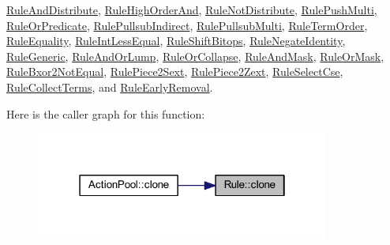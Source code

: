 \mbox{\hyperlink{class_rule_and_distribute_a7c22fc9d5e1f837afb8b13a9cc83ddff}{Rule\+And\+Distribute}}, \mbox{\hyperlink{class_rule_high_order_and_a467fae8c3fcb0944360aa286fa7a44e9}{Rule\+High\+Order\+And}}, \mbox{\hyperlink{class_rule_not_distribute_a15ef3668c177ca8008f4ca27b627c9c3}{Rule\+Not\+Distribute}}, \mbox{\hyperlink{class_rule_push_multi_ae44a8242704738c9f0d415c3987da4b3}{Rule\+Push\+Multi}}, \mbox{\hyperlink{class_rule_or_predicate_a190f266ab1a951a70b6413460c48f0fa}{Rule\+Or\+Predicate}}, \mbox{\hyperlink{class_rule_pullsub_indirect_a6ad44519f0a5f0bd74d31aed1facae02}{Rule\+Pullsub\+Indirect}}, \mbox{\hyperlink{class_rule_pullsub_multi_ad97158dddae367b04cc50438c4380033}{Rule\+Pullsub\+Multi}}, \mbox{\hyperlink{class_rule_term_order_a02f5abd73f44211860e5cdf7f6f9d554}{Rule\+Term\+Order}}, \mbox{\hyperlink{class_rule_equality_a78a0d12ca064653dd2ed59dee9d01cd3}{Rule\+Equality}}, \mbox{\hyperlink{class_rule_int_less_equal_a81819aa711a35d88d8f0f7d9e5aad3e3}{Rule\+Int\+Less\+Equal}}, \mbox{\hyperlink{class_rule_shift_bitops_a3761b74c43ffef291151dc947761e17b}{Rule\+Shift\+Bitops}}, \mbox{\hyperlink{class_rule_negate_identity_a359bedbb109cb97b3d27577486a51a7b}{Rule\+Negate\+Identity}}, \mbox{\hyperlink{class_rule_generic_a98b2f92f8bcfebd473dd4e27fd183815}{Rule\+Generic}}, \mbox{\hyperlink{class_rule_and_or_lump_a6ca08216a9a64058fae83a1718a67301}{Rule\+And\+Or\+Lump}}, \mbox{\hyperlink{class_rule_or_collapse_a30212e0187d8a14ebe2b8adbd396b29a}{Rule\+Or\+Collapse}}, \mbox{\hyperlink{class_rule_and_mask_a0d8910f37dde4f7ee748e529f174f332}{Rule\+And\+Mask}}, \mbox{\hyperlink{class_rule_or_mask_a3e58258633ca9f6a88262b88b95672a1}{Rule\+Or\+Mask}}, \mbox{\hyperlink{class_rule_bxor2_not_equal_a035a4211de0556631e2f3022e56fe24d}{Rule\+Bxor2\+Not\+Equal}}, \mbox{\hyperlink{class_rule_piece2_sext_afe4ede287edfde1d4036142f24469728}{Rule\+Piece2\+Sext}}, \mbox{\hyperlink{class_rule_piece2_zext_ad383e6fe63af0ef65f4c9d5204e39dd5}{Rule\+Piece2\+Zext}}, \mbox{\hyperlink{class_rule_select_cse_ab2c0796a0126999042fd074de0e379fb}{Rule\+Select\+Cse}}, \mbox{\hyperlink{class_rule_collect_terms_a6be2ea00cf9d1c164d33b1f662c74c44}{Rule\+Collect\+Terms}}, and \mbox{\hyperlink{class_rule_early_removal_a51a80e5b1a90383f7ab38dd5da1b19c0}{Rule\+Early\+Removal}}.

Here is the caller graph for this function\+:
\nopagebreak
\begin{figure}[H]
\begin{center}
\leavevmode
\includegraphics[width=274pt]{class_rule_a70de90a76461bfa7ea0b575ce3c11e4d_icgraph}
\end{center}
\end{figure}
\mbox{\label{class_rule_ab3051cfc2bf2286c91023a9f647c86b9}} 
